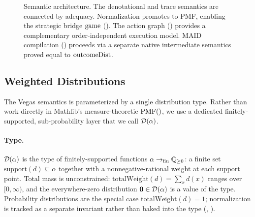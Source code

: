 \documentclass[11pt]{article}
\begin{document}
\begin{figure}[ht]
\centering
{}
\caption{Semantic architecture. The denotational and trace semantics are
connected by adequacy. Normalization promotes to PMF, enabling the strategic
bridge $\mathrm{game}$ (). The action graph
() provides a complementary order-independent execution
model. MAID compilation () proceeds via a separate native
intermediate semantics proved equal to $\mathrm{outcomeDist}$.}\label{fig:layers}
\end{figure}


\subsection{Weighted Distributions}\label{sec:fdist}

The Vegas semantics is parameterized by a single distribution type. Rather
than work directly in Mathlib's measure-theoretic $\mathrm{PMF}()$, we use a
dedicated finitely-supported, sub-probability layer that we call
$\mathcal{D}(\alpha)$.

\paragraph{Type.}
$\mathcal{D}(\alpha)$ is the type of finitely-supported functions
$\alpha \to_{\mathrm{fin}} \mathbb{Q}_{\ge 0}$: a finite set
$\mathrm{support}(d) \subseteq \alpha$ together with a nonnegative-rational
weight at each support point. Total mass is unconstrained:
$\mathrm{totalWeight}(d) = \sum_{x} d(x)$ ranges over $[0, \infty)$, and
the everywhere-zero distribution $\mathbf{0} \in \mathcal{D}(\alpha)$ is a
value of the type. Probability distributions are the special case
$\mathrm{totalWeight}(d) = 1$; normalization is tracked as a separate
invariant rather than baked into the type
(, ).
\end{document}
